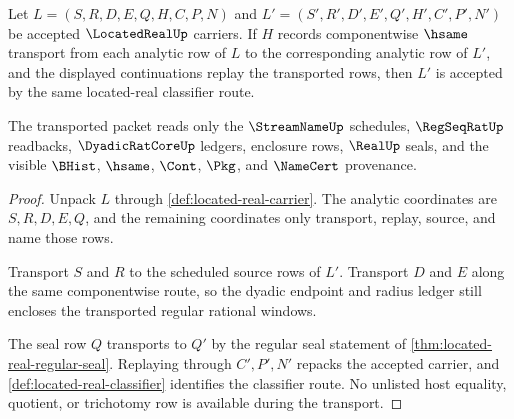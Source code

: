 \begin{theorem}
\label{thm:located-real-transport-stability}
Let $L=(S,R,D,E,Q,H,C,P,N)$ and $L'=(S',R',D',E',Q',H',C',P',N')$ be accepted $\LocatedRealUp$ carriers. If $H$ records componentwise $\hsame$ transport from each analytic row of $L$ to the corresponding analytic row of $L'$, and the displayed continuations replay the transported rows, then $L'$ is accepted by the same located-real classifier route.

The transported packet reads only the $\StreamNameUp$ schedules, $\RegSeqRatUp$ readbacks, $\DyadicRatCoreUp$ ledgers, enclosure rows, $\RealUp$ seals, and the visible $\BHist$, $\hsame$, $\Cont$, $\Pkg$, and $\NameCert$ provenance.
\end{theorem}
\begin{proof}
Unpack $L$ through \autoref{def:located-real-carrier}. The analytic coordinates are $S,R,D,E,Q$, and the remaining coordinates only transport, replay, source, and name those rows.

Transport $S$ and $R$ to the scheduled source rows of $L'$. Transport $D$ and $E$ along the same componentwise route, so the dyadic endpoint and radius ledger still encloses the transported regular rational windows.

The seal row $Q$ transports to $Q'$ by the regular seal statement of \autoref{thm:located-real-regular-seal}. Replaying through $C',P',N'$ repacks the accepted carrier, and \autoref{def:located-real-classifier} identifies the classifier route. No unlisted host equality, quotient, or trichotomy row is available during the transport.
\end{proof}

